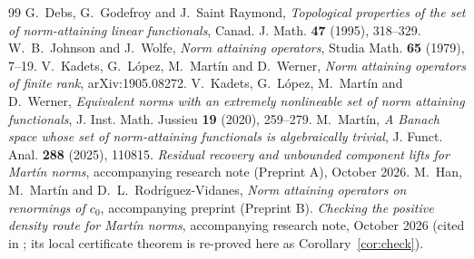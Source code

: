 \begin{thebibliography}{99}
G.~Debs, G.~Godefroy and J.~Saint Raymond,
\emph{Topological properties of the set of norm-attaining linear
functionals}, Canad. J. Math. \textbf{47} (1995), 318--329.
W.~B.~Johnson and J.~Wolfe, \emph{Norm attaining operators},
Studia Math. \textbf{65} (1979), 7--19.
V.~Kadets, G.~L\'opez, M.~Mart\'in and D.~Werner,
\emph{Norm attaining operators of finite rank}, arXiv:1905.08272.
V.~Kadets, G.~L\'opez, M.~Mart\'in and D.~Werner,
\emph{Equivalent norms with an extremely nonlineable set of norm attaining
functionals}, J. Inst. Math. Jussieu \textbf{19} (2020), 259--279.
M.~Mart\'in,
\emph{A Banach space whose set of norm-attaining functionals is
algebraically trivial}, J. Funct. Anal. \textbf{288} (2025), 110815.
\emph{Residual recovery and unbounded component lifts for Mart\'in norms},
accompanying research note (Preprint A), October 2026.
M.~Han, M.~Mart\'in and D.~L.~Rodr\'iguez-Vidanes,
\emph{Norm attaining operators on renormings of $c_0$}, accompanying
preprint (Preprint B).
\emph{Checking the positive density route for Mart\'in norms},
accompanying research note, October 2026 (cited in \cite{PrA}; its local
certificate theorem is re-proved here as Corollary~\ref{cor:check}).
\end{thebibliography}

